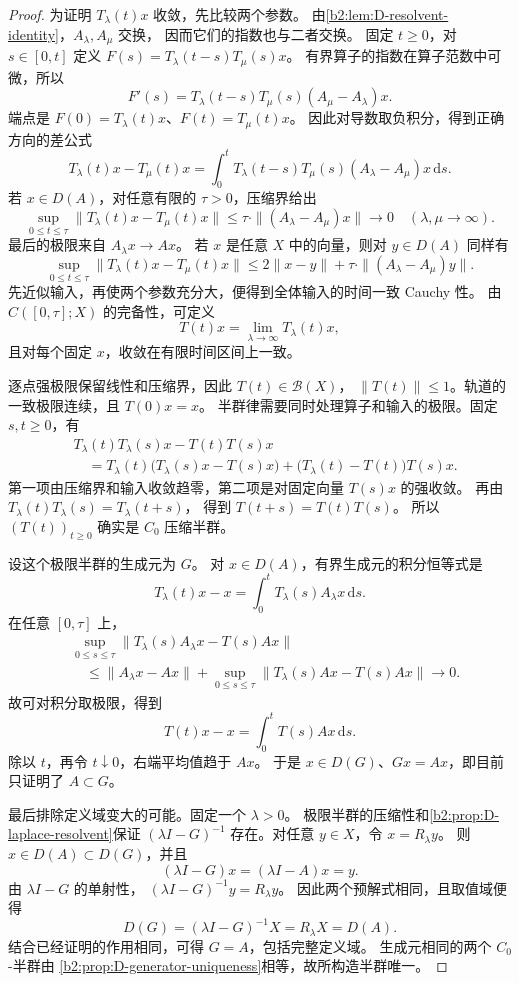 \begin{proof}
为证明 \(T_\lambda(t)x\) 收敛，先比较两个参数。
由\cref{b2:lem:D-resolvent-identity}，\(A_\lambda,A_\mu\) 交换，
因而它们的指数也与二者交换。
固定 \(t\ge0\)，对 \(s\in[0,t]\) 定义
\(F(s)=T_\lambda(t-s)T_\mu(s)x\)。
有界算子的指数在算子范数中可微，所以
\[
 F'(s)=T_\lambda(t-s)T_\mu(s)(A_\mu-A_\lambda)x.
\]
端点是 \(F(0)=T_\lambda(t)x\)、\(F(t)=T_\mu(t)x\)。
因此对导数取负积分，得到正确方向的差公式
\[
 T_\lambda(t)x-T_\mu(t)x
 =\int_0^t T_\lambda(t-s)T_\mu(s)
                      (A_\lambda-A_\mu)x\,\mathrm ds.
\]
若 \(x\in D(A)\)，对任意有限的 \(\tau>0\)，压缩界给出
\[
 \sup_{0\le t\le\tau}
 \|T_\lambda(t)x-T_\mu(t)x\|
 \le\tau\cdot\|(A_\lambda-A_\mu)x\|
 \longrightarrow0
 \quad(\lambda,\mu\to\infty).
\]
最后的极限来自 \(A_\lambda x\to Ax\)。
若 \(x\) 是任意 \(X\) 中的向量，则对 \(y\in D(A)\) 同样有
\[
 \sup_{0\le t\le\tau}
 \|T_\lambda(t)x-T_\mu(t)x\|
 \le2\|x-y\|+\tau\cdot\|(A_\lambda-A_\mu)y\|.
\]
先近似输入，再使两个参数充分大，便得到全体输入的时间一致 Cauchy 性。
由 \(C([0,\tau];X)\) 的完备性，可定义
\[
 T(t)x=\lim_{\lambda\to\infty}T_\lambda(t)x,
\]
且对每个固定 \(x\)，收敛在有限时间区间上一致。

逐点强极限保留线性和压缩界，因此 \(T(t)\in\mathcal B(X)\)，
\(\|T(t)\|\le1\)。轨道的一致极限连续，且 \(T(0)x=x\)。
半群律需要同时处理算子和输入的极限。固定 \(s,t\ge0\)，有
\[
 \begin{aligned}
 &T_\lambda(t)T_\lambda(s)x-T(t)T(s)x\\
 &\quad=T_\lambda(t)\bigl(T_\lambda(s)x-T(s)x\bigr)
       +\bigl(T_\lambda(t)-T(t)\bigr)T(s)x.
 \end{aligned}
\]
第一项由压缩界和输入收敛趋零，第二项是对固定向量 \(T(s)x\) 的强收敛。
再由 \(T_\lambda(t)T_\lambda(s)=T_\lambda(t+s)\)，
得到 \(T(t+s)=T(t)T(s)\)。
所以 \((T(t))_{t\ge0}\) 确实是 \(C_0\) 压缩半群。

设这个极限半群的生成元为 \(G\)。
对 \(x\in D(A)\)，有界生成元的积分恒等式是
\[
 T_\lambda(t)x-x=\int_0^tT_\lambda(s)A_\lambda x\,\mathrm ds.
\]
在任意 \([0,\tau]\) 上，
\[
 \begin{aligned}
 &\sup_{0\le s\le\tau}
   \|T_\lambda(s)A_\lambda x-T(s)Ax\|\\
 &\quad\le\|A_\lambda x-Ax\|
       +\sup_{0\le s\le\tau}\|T_\lambda(s)Ax-T(s)Ax\|
       \longrightarrow0.
 \end{aligned}
\]
故可对积分取极限，得到
\[
 T(t)x-x=\int_0^tT(s)Ax\,\mathrm ds.
\]
除以 \(t\)，再令 \(t\downarrow0\)，右端平均值趋于 \(Ax\)。
于是 \(x\in D(G)\)、\(Gx=Ax\)，即目前只证明了 \(A\subset G\)。

最后排除定义域变大的可能。固定一个 \(\lambda>0\)。
极限半群的压缩性和\cref{b2:prop:D-laplace-resolvent}保证
\((\lambda I-G)^{-1}\) 存在。对任意 \(y\in X\)，令 \(x=R_\lambda y\)。
则 \(x\in D(A)\subset D(G)\)，并且
\[
 (\lambda I-G)x=(\lambda I-A)x=y.
\]
由 \(\lambda I-G\) 的单射性，
\((\lambda I-G)^{-1}y=R_\lambda y\)。
因此两个预解式相同，且取值域便得
\[
 D(G)=(\lambda I-G)^{-1}X=R_\lambda X=D(A).
\]
结合已经证明的作用相同，可得 \(G=A\)，包括完整定义域。
生成元相同的两个 \(C_0\)-半群由
\cref{b2:prop:D-generator-uniqueness}相等，故所构造半群唯一。
\end{proof}

